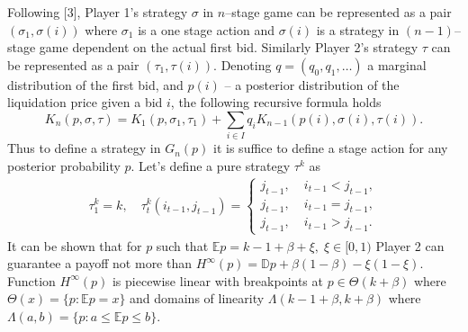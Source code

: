 Following [3], Player 1's strategy $\sigma$ in $n$--stage game can be
represented as a pair $(\sigma_1, \sigma(i))$ where $\sigma_1$ is a one stage
action and $\sigma(i)$ is a strategy in $(n-1)$--stage game dependent on the
actual first bid. Similarly Player 2's strategy $\tau$ can be represented as a
pair $(\tau_1, \tau(i))$. Denoting $q = (q_0, q_1, \ldots)$ a marginal
distribution of the first bid, and $p(i)$ -- a posterior distribution of the
liquidation price given a bid $i$, the following recursive formula holds
\begin{equation*}
  K_n(p, \sigma, \tau) = K_1(p, \sigma_1, \tau_1) +
  \sum_{i \in I} q_i K_{n-1}(p(i), \sigma(i), \tau(i)).
\end{equation*}
Thus to define a strategy in $G_n(p)$ it is suffice to define a stage action for
any posterior probability $p$. Let's define a pure strategy $\tau^k$ as
\begin{gather*}
  \tau_1^k = k, \quad
  \tau_t^k(i_{t-1}, j_{t-1}) =
  \begin{cases}
    j_{t-1}, &\; i_{t-1} < j_{t-1},\\
    j_{t-1}, &\; i_{t-1} = j_{t-1},\\
    j_{t-1}, &\; i_{t-1} > j_{t-1}.
  \end{cases}
\end{gather*}
It can be shown that for $p$ such that $\mathbb{E} p = k - 1 + \beta + \xi, \;
\xi \in [0, 1)$ Player 2 can guarantee a payoff not more than $H^\infty(p) =
\mathbb{D} p + \beta(1-\beta) -\xi(1-\xi)$. Function $H^\infty(p)$ is piecewise
linear with breakpoints at $p \in \Theta(k + \beta)$ where $\Theta(x) = \{p:
\mathbb{E} p = x\}$ and domains of linearity $\Lambda(k - 1 + \beta, k + \beta)$ where
$\Lambda(a, b) = \{p: a \leq \mathbb{E}p \leq b \}$.


